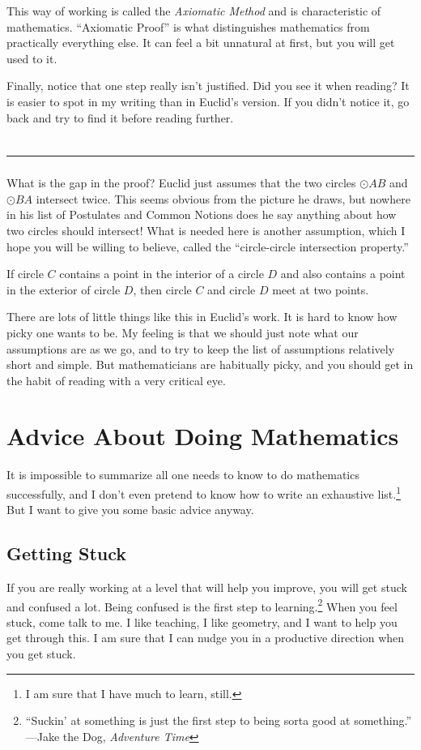 This way of working is called the \emph{Axiomatic Method} and is characteristic of mathematics.
``Axiomatic Proof'' is what distinguishes mathematics from practically everything else.
It can feel a bit unnatural at first, but you will get used to it.

Finally, notice that one step really isn't justified.
Did you see it when reading?
It is easier to spot in my writing than in Euclid's version.
If you didn't notice it, go back and try to find it before reading further. 

$\phantom{space}$\\
\hrule
$\phantom{space}$\\


What is the gap in the proof?
Euclid just assumes that the two circles $\odot AB$ and $\odot BA$ intersect twice.
This seems obvious from the picture he draws, but nowhere in his list of Postulates and Common Notions does he say anything about how two circles should intersect!
What is needed here is another assumption, which I hope you will be willing to believe, called the ``circle-circle intersection property.''
\begin{postulate}
If circle $C$ contains a point in the interior of a circle $D$ and also contains a point in the exterior of circle $D$, then circle $C$ and circle $D$ meet at two points.
\end{postulate}

There are lots of little things like this in Euclid's work.
It is hard to know how picky one wants to be.
My feeling is that we should just note what our assumptions are as we go, and to try to keep the list of assumptions relatively short and simple.
But mathematicians are habitually picky, and you should get in the habit of reading with a very critical eye.


\section*{Advice About Doing Mathematics}
 It is impossible to summarize all one needs to know to do mathematics successfully, and I don't even pretend to know how to write an exhaustive list.\footnote{I am sure that I have much to learn, still.} But I want to give you some basic advice anyway.

\subsection*{Getting Stuck}
If you are really working at a level that will help you improve, you will get stuck and confused a lot.
Being confused is the first step to learning.\footnote{``Suckin' at something is just the first step to being sorta good at something.'' ---Jake the Dog, \emph{Adventure Time}}
When you feel stuck, come talk to me.
I like teaching, I like geometry, and I want to help you get through this.
I am sure that I can nudge you in a productive direction when you get stuck.

